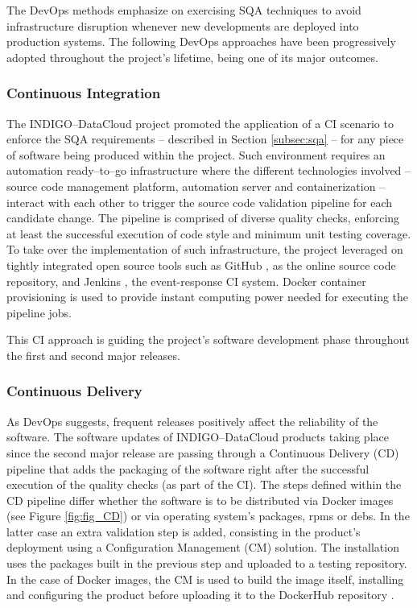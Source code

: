 \documentclass[journal]{IEEEtran}
\begin{document}
The DevOps methods emphasize on exercising SQA techniques to avoid infrastructure
disruption whenever new developments are deployed into production systems. The 
following DevOps approaches have been progressively adopted throughout the project's
lifetime, being one of its major outcomes.

\subsubsection{Continuous Integration}
\label{subsec:ci}
The INDIGO--DataCloud project promoted the application of a CI scenario to enforce
the SQA requirements -- described in Section \ref{subsec:sqa} -- for any piece of
software being produced within the project. Such environment requires an automation
ready--to--go infrastructure where the different technologies involved -- source code
management platform, automation server and containerization -- interact with each
other to trigger the source code validation pipeline for each candidate change. The
pipeline is comprised of diverse quality checks, enforcing at least the successful
execution of code style and minimum unit testing coverage. To take over the 
implementation of such infrastructure, the project leveraged on tightly integrated open
source tools such as GitHub \cite{github}, as the online source code repository,
and Jenkins \cite{jenkins}, the event-response CI system. Docker container provisioning
is used to provide instant computing power needed for executing the pipeline jobs. 

This CI approach is guiding the project’s software development phase throughout the
first and second major releases.

\subsubsection{Continuous Delivery}
As DevOps suggests, frequent releases positively affect the reliability of the
software. The software updates of INDIGO--DataCloud products taking place since
the second major release are passing through a Continuous Delivery (CD)
pipeline that adds the packaging of the software right after the successful execution of
the quality checks (as part of the CI). 
The steps defined within the CD pipeline differ whether the software is to be distributed via Docker
images (see Figure \ref{fig:fig_CD}) or via operating system’s packages, rpms or debs. In the latter case an extra
validation step is added, consisting in the product’s deployment using a
Configuration Management (CM) solution. The installation uses the packages
built in the previous step and uploaded to a testing
repository. In the case of Docker images, the CM is used to build the image
itself, installing and configuring the product before uploading it to the
DockerHub repository \cite{indigo-dockerhub}. 
\end{document}
